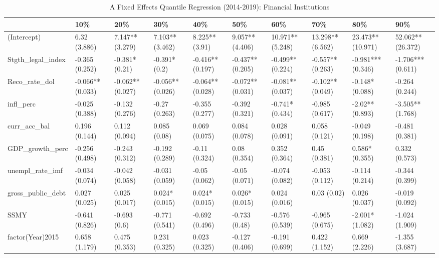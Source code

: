 \begin{table}[ht]
\centering
\caption{A Fixed Effects Quantile Regression (2014-2019): Financial Institutions} 
\begingroup\small
\begin{tabular}{llllllllll}
  \toprule
 & 10\% & 20\% & 30\% & 40\% & 50\% & 60\% & 70\% & 80\% & 90\% \\ 
  \midrule
(Intercept) & 6.32 (3.886) & 7.147** (3.279) & 7.103** (3.462) & 8.225** (3.91) & 9.057** (4.406) & 10.971** (5.248) & 13.298** (6.562) & 23.473** (10.971) & 52.062** (26.372) \\ 
  Stgth\_legal\_index & -0.365 (0.252) & -0.381* (0.21) & -0.391* (0.2) & -0.416** (0.197) & -0.437** (0.205) & -0.499** (0.224) & -0.557** (0.263) & -0.981*** (0.346) & -1.706*** (0.611) \\ 
  Reco\_rate\_dol & -0.066** (0.033) & -0.062** (0.027) & -0.056** (0.026) & -0.064** (0.028) & -0.072** (0.031) & -0.081** (0.037) & -0.102** (0.049) & -0.148* (0.088) & -0.264 (0.244) \\ 
  infl\_perc & -0.025 (0.388) & -0.132 (0.276) & -0.27 (0.263) & -0.355 (0.277) & -0.392 (0.321) & -0.741* (0.434) & -0.985 (0.617) & -2.02** (0.893) & -3.505** (1.768) \\ 
  curr\_acc\_bal & 0.196 (0.144) & 0.112 (0.094) & 0.085 (0.08) & 0.069 (0.075) & 0.084 (0.078) & 0.028 (0.091) & 0.058 (0.121) & -0.049 (0.198) & -0.481 (0.381) \\ 
  GDP\_growth\_perc & -0.256 (0.498) & -0.243 (0.312) & -0.192 (0.289) & -0.11 (0.324) & 0.08 (0.354) & 0.352 (0.364) & 0.45 (0.381) & 0.586* (0.355) & 0.332 (0.573) \\ 
  unempl\_rate\_imf & -0.034 (0.074) & -0.042 (0.058) & -0.031 (0.059) & -0.05 (0.062) & -0.05 (0.071) & -0.074 (0.082) & -0.053 (0.112) & -0.114 (0.214) & -0.344 (0.399) \\ 
  gross\_public\_debt & 0.027 (0.025) & 0.025 (0.017) & 0.024* (0.015) & 0.024* (0.015) & 0.026* (0.015) & 0.024 (0.016) & 0.03 (0.02) & 0.026 (0.037) & -0.019 (0.092) \\ 
  SSMY & -0.641 (0.826) & -0.693 (0.6) & -0.771 (0.541) & -0.692 (0.496) & -0.733 (0.48) & -0.576 (0.539) & -0.965 (0.675) & -2.001* (1.082) & -1.024 (1.909) \\ 
  factor(Year)2015 & 0.658 (1.179) & 0.475 (0.353) & 0.231 (0.325) & 0.023 (0.325) & -0.127 (0.406) & -0.191 (0.699) & 0.422 (1.152) & 0.669 (2.226) & -1.355 (3.687) \\ 

\end{tabular}
\end{table}
